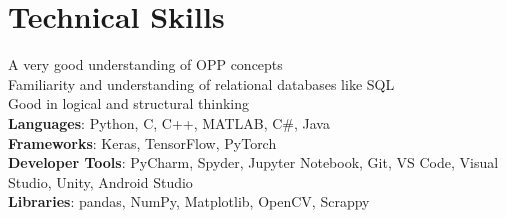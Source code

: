 \documentclass[letterpaper,11pt]{article}
\begin{document}
\section{Technical Skills}
 \begin{itemize}[leftmargin=0.15in, label={}]
    \small{
    \item{
     {A very good understanding of OPP concepts} \\
     {Familiarity and understanding of relational databases like SQL} \\
     {Good in logical and structural thinking} \\
     \textbf{Languages}{: Python, C, C++, MATLAB, C\#, Java} \\
     \textbf{Frameworks}{: Keras, TensorFlow, PyTorch} \\
     \textbf{Developer Tools}{: PyCharm, Spyder, Jupyter Notebook, Git, VS Code, Visual Studio, Unity, Android Studio} \\
     \textbf{Libraries}{: pandas, NumPy, Matplotlib, OpenCV, Scrappy} }
     }
 \end{itemize}


\end{document}

